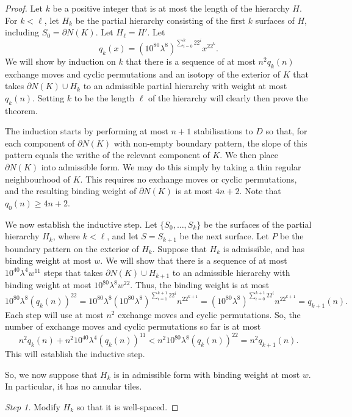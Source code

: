 \documentclass[oneside]{amsart}
\numberwithin{equation}{section}
\theoremstyle{plain}
\theoremstyle{definition}
\begin{document}
\begin{proof}
 Let $k$ be a positive integer that is at most the length of the hierarchy $H$.
For $k < \ell$, let $H_k$ be the partial hierarchy consisting of the first $k$ surfaces of $H$, including $S_0 = \partial N(K)$. 
Let $H_\ell = H'$.
Let 
$$q_k(x) = (10^{80} \lambda^8)^{\sum_{i=0}^k {22}^i} x^{22^k}.$$
We will show by induction on $k$ that 
there is a sequence of at most $n^2 q_k(n)$ exchange moves and cyclic permutations and 
an isotopy of the exterior of $K$ that takes $\partial N(K) \cup H_k$ to an admissible partial hierarchy with weight at most $q_k(n)$.
Setting $k$ to be the length $\ell$ of the hierarchy will clearly then prove the theorem.

The induction starts by performing at most $n+1$ stabilisations to $D$ so that, for each component of $\partial N(K)$
with non-empty boundary pattern, the slope of this pattern equals the writhe of the relevant component of $K$.
We then place $\partial N(K)$ into admissible form. We may do this
simply by taking a thin regular neighbourhood of $K$. This requires no exchange moves
or cyclic permutations, and the resulting binding weight of $\partial N(K)$ is at most $4n+2$.
Note that $q_0(n) \geq 4n+2$.

We now establish the inductive step. Let $\{S_0, \dots, S_k \}$ be the surfaces of the partial hierarchy $H_k$, where $k < \ell$,
and let $S = S_{k+1}$ be the next surface. Let $P$ be the boundary pattern on the exterior of
$H_k$. Suppose that $H_k$ is admissible, and has binding weight at most $w$. 
We will show that there is a sequence of
at most $10^{40} \lambda^4 w^{11}$
steps that takes $\partial N(K) \cup H_{k+1}$
to an admissible hierarchy with binding weight at most 
$10^{80} \lambda^8 w^{22}$. 
Thus, the binding weight is at most
$$10^{80} \lambda^8 (q_k(n))^{22} = 10^{80} \lambda^8 (10^{80} \lambda^8)^{\sum_{i=1}^{k+1} {22}^i} n^{22^{k+1}}
= (10^{80} \lambda^8)^{\sum_{i=0}^{k+1} 22^i} n^{22^{k+1}}= q_{k+1}(n).$$
Each step will use at most $n^2$ exchange moves and cyclic permutations.
So, the number of exchange moves and cyclic permutations so far is at most
$$n^2 q_k(n) + n^2 10^{40} \lambda^4 (q_k(n))^{11} < n^2 10^{80} \lambda^8 (q_k(n))^{22} = n^2 q_{k+1}(n).$$
This will establish the inductive step.

So, we now suppose that $H_k$ is in admissible form with binding weight at most $w$. In particular, it has no
annular tiles.

\medskip
\emph{Step 1.} Modify $H_k$ so that it is well-spaced.


\end{proof}
\end{document}
